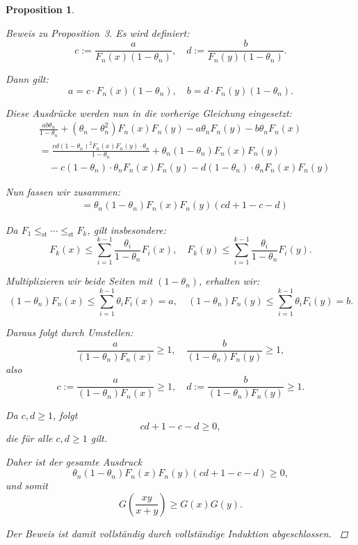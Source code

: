 \documentclass[
12pt,
fancyheadings, %
%
a4paper, 
%
]{tuhhreprt}
\newtheorem{proposition}[definition]{Proposition}
\begin{document}
\begin{proposition}
\begin{proof}[Beweis zu Proposition~3]
Es wird definiert:
\[
c := \frac{a}{F_n(x)(1 - \theta_n)}, \quad
d := \frac{b}{F_n(y)(1 - \theta_n)}.
\]

Dann gilt:
\[
a = c \cdot F_n(x)(1 - \theta_n), \quad
b = d \cdot F_n(y)(1 - \theta_n).
\]

Diese Ausdrücke werden nun in die vorherige Gleichung eingesetzt:
\begin{align*}
&\frac{ab\theta_n}{1 - \theta_n}
+ (\theta_n - \theta_n^2) F_n(x) F_n(y)
- a \theta_n F_n(y)
- b \theta_n F_n(x) \\
%
&= \frac{c d (1 - \theta_n)^2 F_n(x) F_n(y) \cdot \theta_n}{1 - \theta_n}
+ \theta_n (1 - \theta_n) F_n(x) F_n(y) \\
&\quad - c (1 - \theta_n) \cdot \theta_n F_n(x) F_n(y)
- d (1 - \theta_n) \cdot \theta_n F_n(x) F_n(y)
\end{align*}

Nun fassen wir zusammen:
\begin{align*}
&= \theta_n (1 - \theta_n) F_n(x) F_n(y)
\left( cd + 1 - c - d \right)
\end{align*}

Da \( F_1 \leq_{\mathrm{st}} \cdots \leq_{\mathrm{st}} F_k \), gilt insbesondere:
\[
F_k(x) \leq \sum_{i=1}^{k-1} \frac{\theta_i}{1 - \theta_n} F_i(x),
\quad
F_k(y) \leq \sum_{i=1}^{k-1} \frac{\theta_i}{1 - \theta_n} F_i(y).
\]

Multiplizieren wir beide Seiten mit \( (1 - \theta_n) \), erhalten wir:
\[
(1 - \theta_n) F_n(x) \leq \sum_{i=1}^{k-1} \theta_i F_i(x) = a,
\quad
(1 - \theta_n) F_n(y) \leq \sum_{i=1}^{k-1} \theta_i F_i(y) = b.
\]

Daraus folgt durch Umstellen:
\[
\frac{a}{(1 - \theta_n) F_n(x)} \geq 1,
\quad
\frac{b}{(1 - \theta_n) F_n(y)} \geq 1,
\]
also
\[
c := \frac{a}{(1 - \theta_n) F_n(x)} \geq 1,
\quad
d := \frac{b}{(1 - \theta_n) F_n(y)} \geq 1.
\]

Da \( c, d \geq 1 \), folgt
\[
cd + 1 - c - d \geq 0,
\]
die für alle \( c, d \geq 1 \) gilt.

Daher ist der gesamte Ausdruck
\[
\theta_n (1 - \theta_n) F_n(x) F_n(y) (cd + 1 - c - d) \geq 0,
\]
und somit
\[
G\left( \frac{xy}{x + y} \right) \geq G(x) G(y).
\]

Der Beweis ist damit vollständig durch vollständige Induktion abgeschlossen. \cite{ChenShneer2024}



\end{proof}
\end{proposition}









    























\backmatter
{}


\end{document}
